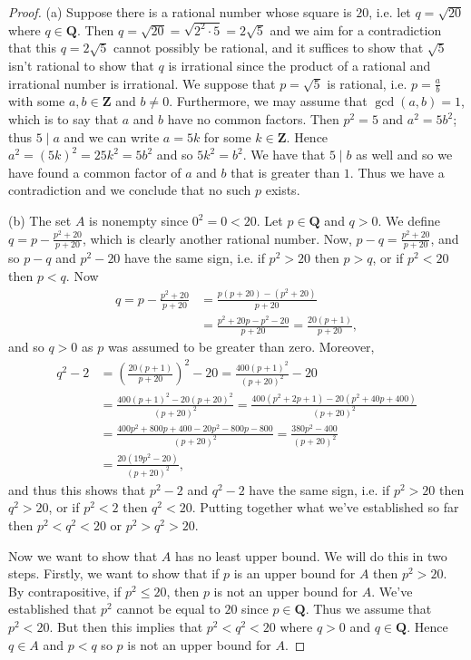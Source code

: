 \documentclass[9pt,reqno]{amsart}
\theoremstyle{definition}
\newcommand{\zz}{\mathbf Z}
\newcommand{\qq}{\mathbf Q}
\begin{document}
\begin{proof}
		(a) Suppose there is a rational number whose square is $20$, i.e. let $q = \sqrt{20}$ where $q \in \qq$. Then $q = \sqrt{20} = \sqrt{2^2 \cdot 5} = 2 \sqrt{5}$ and we aim for a contradiction that this $q = 2 \sqrt{5}$ cannot possibly be rational, and it suffices to show that $\sqrt{5}$ isn't rational to show that $q$ is irrational since the product of a rational and irrational number is irrational. We suppose that $p = \sqrt{5}$ is rational, i.e. $p = \frac{a}{b}$ with some $a, b \in \zz$ and $b \neq 0$. Furthermore, we may assume that $\gcd(a, b) = 1$, which is to say that $a$ and $b$ have no common factors. Then $p^2 = 5$ and $a^2 = 5b^2$; thus $5 \mid a$ and we can write $a = 5k$ for some $k \in \zz$. Hence $a^2 = (5k)^2 = 25k^2 = 5b^2$ and so $5k^2 = b^2$. We have that $ 5 \mid b$ as well and so we have found a common factor of $a$ and $b$ that is greater than $1$. Thus we have a contradiction and we conclude that no such $p$ exists. 
		
		(b) The set $A$ is nonempty since $ 0^2 = 0 < 20$. Let $p \in \qq$ and $q > 0$. We define $q = p -\frac{p^2+20}{p+20}$, which is clearly another rational number. Now, $p-q =\frac{p^2+20}{p+20}$, and so $p-q$ and $p^2-20$ have the same sign, i.e. if $p^2>20$ then $p>q$, or if $p^2<20$ then $p<q$. Now \begin{align}
			q = p - \frac{p^2+20}{p+20} &= \frac{p(p+20) -(p^2+20)}{p+20} \\ 
			&= \frac{p^2+20p-p^2 -20}{p+20} = \frac{20(p+1)}{p+20},
		\end{align}
		and so $q > 0$ as $p$ was assumed to be greater than zero. Moreover, 
		\begin{align}
			q^2 -2 &= \left (\frac{20(p+1)}{p+20} \right)^2 -20 = \frac{400(p+1)^2}{(p+20)^2}-20 \\
			&= \frac{400(p+1)^2 - 20(p+20)^2}{(p+20)^2} = \frac{400(p^2+2p+1) - 20(p^2 + 40p+400)}{(p+20)^2} \\
			&= \frac{400p^2+800p+400-20p^2-800p-800}{(p+20)^2} = \frac{380p^2-400 }{(p+20)^2} \\&= \frac{20(19p^2-20)}{(p+20)^2},
		\end{align}
		and thus this shows that $p^2 -2$ and $q^2- 2$ have the same sign, i.e. if $p^2>20$ then $q^2>20$, or if $p^2<2$ then $q^2 < 20$. Putting together what we've established so far then $p^2<q^2<20$ or $p^2>q^2 > 20$. 
		
		Now we want to show that $A$ has no least upper bound. We will do this in two steps. Firstly, we want to show that if $p$ is an upper bound for $A$ then $p^2>20$. By contrapositive, if $p^2 \leq 20$, then $p$ is not an upper bound for $A$. We've established that $p^2$ cannot be equal to $20$ since $ p \in \qq$. Thus we assume that $p^2 < 20$. But then this implies that $p^2 < q^2 <20$ where $q > 0$ and $q \in \qq$. Hence $q \in A$ and $p<q$ so $p$ is not an upper bound for $A$.
		

\end{proof}
\end{document}
